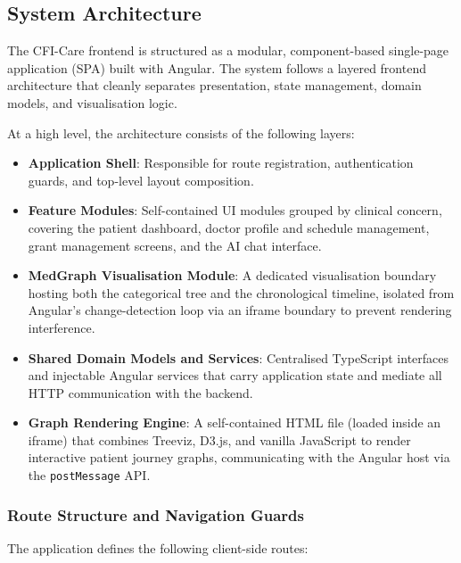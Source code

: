 \subsection{System Architecture}
\label{sec:system-architecture}

The CFI-Care frontend is structured as a modular, component-based single-page
application (SPA) built with Angular. The system follows a layered frontend
architecture that cleanly separates presentation, state management, domain
models, and visualisation logic.

At a high level, the architecture consists of the following layers:

\begin{itemize}
    \item \textbf{Application Shell}: Responsible for route registration,
          authentication guards, and top-level layout composition.
    \item \textbf{Feature Modules}: Self-contained UI modules grouped by
          clinical concern, covering the patient dashboard, doctor profile and
          schedule management, grant management screens, and the AI chat
          interface.
    \item \textbf{MedGraph Visualisation Module}: A dedicated
          visualisation boundary hosting both the categorical tree and the
          chronological timeline, isolated from Angular's change-detection loop
          via an iframe boundary to prevent rendering interference.
    \item \textbf{Shared Domain Models and Services}: Centralised TypeScript
          interfaces and injectable Angular services that carry application
          state and mediate all HTTP communication with the backend.
    \item \textbf{Graph Rendering Engine}: A self-contained HTML file
          (loaded inside an iframe) that combines Treeviz, D3.js, and
          vanilla JavaScript to render interactive patient journey graphs,
          communicating with the Angular host via the \texttt{postMessage} API.
\end{itemize}

\subsubsection{Route Structure and Navigation Guards}

The application defines the following client-side routes:

